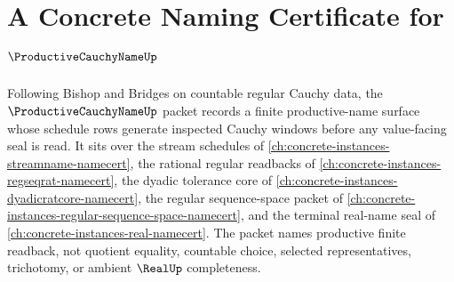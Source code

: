 \chapter{A Concrete Naming Certificate for $\ProductiveCauchyNameUp$}
\label{ch:concrete-instances-productive-cauchy-name-namecert}

Following Bishop and Bridges on countable regular Cauchy data, the $\ProductiveCauchyNameUp$ packet records a finite productive-name surface whose schedule rows generate inspected Cauchy windows before any value-facing seal is read. It sits over the stream schedules of \autoref{ch:concrete-instances-streamname-namecert}, the rational regular readbacks of \autoref{ch:concrete-instances-regseqrat-namecert}, the dyadic tolerance core of \autoref{ch:concrete-instances-dyadicratcore-namecert}, the regular sequence-space packet of \autoref{ch:concrete-instances-regular-sequence-space-namecert}, and the terminal real-name seal of \autoref{ch:concrete-instances-real-namecert}. The packet names productive finite readback, not quotient equality, countable choice, selected representatives, trichotomy, or ambient $\RealUp$ completeness.

